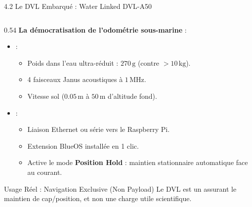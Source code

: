 \begin{frame}{4.2 Le DVL Embarqué : Water Linked DVL-A50}
  \begin{columns}[T]
    \begin{column}{0.54\textwidth}
      \textbf{La démocratisation de l'odométrie sous-marine} :
      \scriptsize
      \begin{itemize}
        \item {} :
          \begin{itemize}\scriptsize
            \item Poids dans l'eau ultra-réduit : \textbf{$270\,\text{g}$} (contre $>10\,\text{kg}$).
            \item 4 faisceaux Janus acoustiques à $1\,\text{MHz}$.
            \item Vitesse sol ($0.05\,\text{m}$ à $50\,\text{m}$ d'altitude fond).
          \end{itemize}
        \item {} :
          \begin{itemize}\scriptsize
            \item Liaison Ethernet ou série vers le Raspberry Pi.
            \item Extension BlueOS installée en 1 clic.
            \item Active le mode \textbf{Position Hold} : maintien stationnaire automatique face au courant.
          \end{itemize}
      \end{itemize}

      \vspace{0.2em}
      \begin{alertblock}{Usage Réel : Navigation Exclusive (Non Payload)}
        \scriptsize
        Le DVL est un  assurant le maintien de cap/position, et non une charge utile scientifique.
      \end{alertblock}
    \end{column}


\end{columns}
\end{frame}
